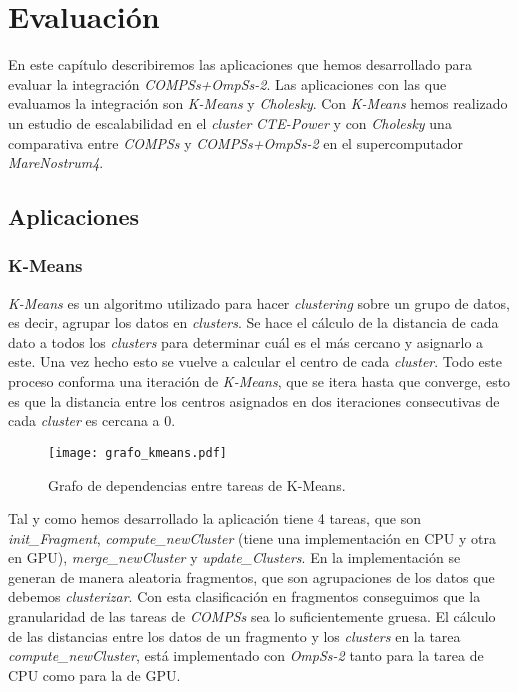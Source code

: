 \chapter{Evaluación}
\label{sec:estudiorend}

En este capítulo describiremos las aplicaciones que hemos desarrollado para evaluar la integración \textit{COMPSs+OmpSs-2}. Las aplicaciones con las que evaluamos la integración son \textit{K-Means} y \textit{Cholesky}. Con \textit{K-Means} hemos realizado un estudio de escalabilidad en el \textit{cluster} \textit{CTE-Power} y con \textit{Cholesky} una comparativa entre \textit{COMPSs} y \textit{COMPSs+OmpSs-2} en el supercomputador \textit{MareNostrum4}. 

\section{Aplicaciones}
\subsection{K-Means}

\textit{K-Means} es un algoritmo utilizado para hacer \textit{clustering} sobre un grupo de datos, es decir, agrupar los datos en \textit{clusters}. Se hace el cálculo de la distancia de cada dato a todos los \textit{clusters} para determinar cuál es el más cercano y asignarlo a este. Una vez hecho esto se vuelve a calcular el centro de cada \textit{cluster}. Todo este proceso conforma una iteración de \textit{K-Means}, que se itera hasta que converge, esto es que la distancia entre los centros asignados en dos iteraciones consecutivas de cada \textit{cluster} es cercana a 0.

\begin{figure}[h]
	\centering 
	\caption{Grafo de dependencias entre tareas de K-Means.}
	\texttt{[image: grafo\_kmeans.pdf]}
	\label{fig:grafokmeans}
\end{figure}

Tal y como hemos desarrollado la aplicación tiene 4 tareas, que son \textit{init\_Fragment}, \textit{compute\_newCluster} (tiene una implementación en CPU y otra en GPU), \textit{merge\_newCluster} y \textit{update\_Clusters}. En la implementación se generan de manera aleatoria fragmentos, que son agrupaciones de los datos que debemos \textit{clusterizar}. Con esta clasificación en fragmentos conseguimos que la granularidad de las tareas de \textit{COMPSs} sea lo suficientemente gruesa. El cálculo de las distancias entre los datos de un fragmento y los \textit{clusters} en la tarea \textit{compute\_newCluster}, está implementado con \textit{OmpSs-2} tanto para la tarea de CPU como para la de GPU.

